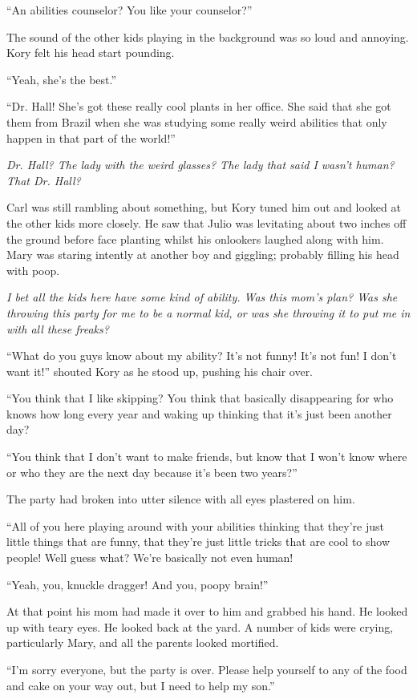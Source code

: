 ``An abilities counselor? You like your counselor?''

The sound of the other kids playing in the background was so loud and annoying. Kory felt his head start pounding.

``Yeah, she's the best.''

``Dr. Hall! She's got these really cool plants in her office. She said that she got them from Brazil when she was studying some really weird abilities that only happen in that part of the world!''

\textit{Dr. Hall? The lady with the weird glasses? The lady that said I wasn't human? That Dr. Hall?}

Carl was still rambling about something, but Kory tuned him out and looked at the other kids more closely. He saw that Julio was levitating about two inches off the ground before face planting whilst his onlookers laughed along with him. Mary was staring intently at another boy and giggling; probably filling his head with poop.

\textit{I bet all the kids here have some kind of ability. Was this mom's plan? Was she throwing this party for me to be a normal kid, or was she throwing it to put me in with all these freaks?}

``What do you guys know about my ability? It's not funny! It's not fun! I don't want it!'' shouted Kory as he stood up, pushing his chair over.

``You think that I like skipping? You think that basically disappearing for who knows how long every year and waking up thinking that it's just been another day?

``You think that I don't want to make friends, but know that I won't know where or who they are the next day because it's been two years?''

The party had broken into utter silence with all eyes plastered on him.

``All of you here playing around with your abilities thinking that they're just little things that are funny, that they're just little tricks that are cool to show people! Well guess what? We're basically not even human!

``Yeah, you, knuckle dragger! And you, poopy brain!''

At that point his mom had made it over to him and grabbed his hand. He looked up with teary eyes. He looked back at the yard. A number of kids were crying, particularly Mary, and all the parents looked mortified.

``I'm sorry everyone, but the party is over. Please help yourself to any of the food and cake on your way out, but I need to help my son.''

